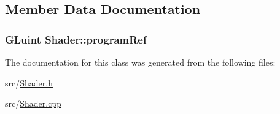 \subsection{Member Data Documentation}
\subsubsection[{\texorpdfstring{program\+Ref}{programRef}}]{\setlength{\rightskip}{0pt plus 5cm}G\+Luint Shader\+::program\+Ref\hspace{0.3cm}{\ttfamily [protected]}}\hypertarget{class_shader_ac565e02af616d8b73ade58edb2f26ca5}{}\label{class_shader_ac565e02af616d8b73ade58edb2f26ca5}


The documentation for this class was generated from the following files\+:\begin{DoxyCompactItemize}
\item 
src/\hyperlink{_shader_8h}{Shader.\+h}\item 
src/\hyperlink{_shader_8cpp}{Shader.\+cpp}\end{DoxyCompactItemize}
